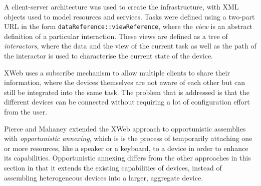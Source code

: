 A client-server architecture was used to create the infrastructure, with \ac{XML} objects used to model resources and services. Tasks were defined using a two-part \ac{URL} in the form \texttt{dataReference::viewReference}, where the \emph{view} is an abstract definition of a particular interaction. These views are defined as a tree of \emph{interactors}, where the data and the view of the current task as well as the path of the interactor is used to characterise the current state of the device.

XWeb uses a subscribe mechanism to allow multiple clients to share their information, where the devices themselves are not aware of each other but can still be integrated into the same task. The problem that is addressed is that the different devices can be connected without requiring a lot of configuration effort from the user.

Pierce and Mahaney \cite{Pierce2003} extended the XWeb approach to opportunistic assemblies with \emph{opportunistic annexing}, which is is the process of temporarily attaching one or more resources, like a speaker or a keyboard, to a device in order to enhance its capabilities. Opportunistic annexing differs from the other approaches in this section in that it extends the existing capabilities of devices, instead of assembling heterogeneous devices into a larger, aggregate device. %


% 	

